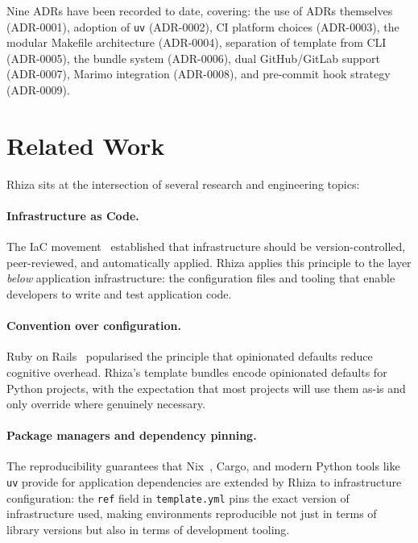 \documentclass[12pt,a4paper]{article}
\begin{document}
Nine ADRs have been recorded to date, covering: the use of ADRs themselves (ADR-0001), adoption of \texttt{uv} (ADR-0002), CI platform choices (ADR-0003), the modular Makefile architecture (ADR-0004), separation of template from CLI (ADR-0005), the bundle system (ADR-0006), dual GitHub/GitLab support (ADR-0007), Marimo integration (ADR-0008), and pre-commit hook strategy (ADR-0009).

\section{Related Work}
\label{sec:related}

Rhiza sits at the intersection of several research and engineering topics:

\paragraph{Infrastructure as Code.} The IaC movement~\cite{humble2010continuous} established that infrastructure should be version-controlled, peer-reviewed, and automatically applied. Rhiza applies this principle to the layer \emph{below} application infrastructure: the configuration files and tooling that enable developers to write and test application code.

\paragraph{Convention over configuration.} Ruby on Rails~\cite{rails} popularised the principle that opinionated defaults reduce cognitive overhead. Rhiza's template bundles encode opinionated defaults for Python projects, with the expectation that most projects will use them as-is and only override where genuinely necessary.

\paragraph{Package managers and dependency pinning.} The reproducibility guarantees that Nix~\cite{dolstra2004nix}, Cargo, and modern Python tools like \texttt{uv} provide for application dependencies are extended by Rhiza to infrastructure configuration: the \texttt{ref} field in \texttt{template.yml} pins the exact version of infrastructure used, making environments reproducible not just in terms of library versions but also in terms of development tooling.
\end{document}
